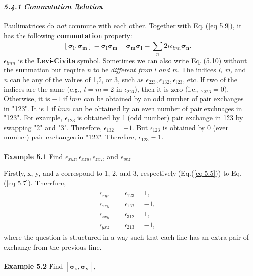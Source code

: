 \documentclass{article}
\newcommand{\bfit}[1]{\textit{\textbf{#1}}}
\begin{document}
\bfit{\large 5.4.1 Commutation Relation}\\\\
Paulimatrices do \textit{not} commute with each other. Together with Eq. (\ref{eq 5.9}),
it has the following \textbf{commutation} property:
\begin{equation} \label{eq 5.10}
    [\boldsymbol{\sigma_l},\boldsymbol{\sigma_m}]=\boldsymbol{\sigma_l}\boldsymbol{\sigma_m}-\boldsymbol{\sigma_m}\boldsymbol{\sigma_l}=\sum_{n}^{}2i\epsilon_{lmn}\boldsymbol{\sigma_n}. \tag{5.10}
\end{equation}
$\epsilon_{lmn}$ is the \textbf{Levi-Civita} symbol. Sometimes we can also write Eq. (5.10)
without the summation but require \textit{n} to be \textit{different from l and m}. The indices \textit{l, m,} and \textit{n}
can be any of the values of 1,2, or 3, such as $\epsilon_{223}, \epsilon_{132}, \epsilon_{123}$, etc. If
two of the indices are the same (e.g., $l=m=2$ in $\epsilon_{223}$), then it is zero (i.e., $\epsilon_{223}=0$).
Otherwise, it is $-1$ if $lmn$ can be obtained by an odd number of pair exchanges in "123".
It is 1 if $lmn$ can be obtained by an even number of pair exchnages in "123".
For example, $\epsilon_{123}$ is obtained by 1 (odd number) pair exchange in 123 by swapping
"2" and "3". Therefore, $\epsilon_{132}=-1$. But $\epsilon_{123}$ is obtained by 0 (even number) pair exchanges in 
"123". Therefore, $\epsilon_{123}=1$.\\\\
\textbf{Example 5.1} Find $\epsilon_{xyz}, \epsilon_{xzy}, \epsilon_{zxy}$, and $\epsilon_{yxz}$

Firstly, x, y, and z correspond to 1, 2, and 3, respectively (Eq.(\ref{eq 5.5})) to Eq.(\ref{eq 5.7}).
Therefore,
\begin{align} \label{eq 5.11}
    \begin{split}
        \epsilon_{xyz}&=\epsilon_{123}=1,\\
        \epsilon_{xzy}&=\epsilon_{132}=-1,\\
        \epsilon_{zxy}&=\epsilon_{312}=1,\\
        \epsilon_{yxz}&=\epsilon_{213}=-1,
    \end{split} \tag{5.11}
\end{align}
where the question is structured in a way such that each line has an extra pair of 
exchange from the previous line.
\\\\
\textbf{Example 5.2} Find $[\boldsymbol{\sigma_x},\boldsymbol{\sigma_y}]$,
\end{document}
